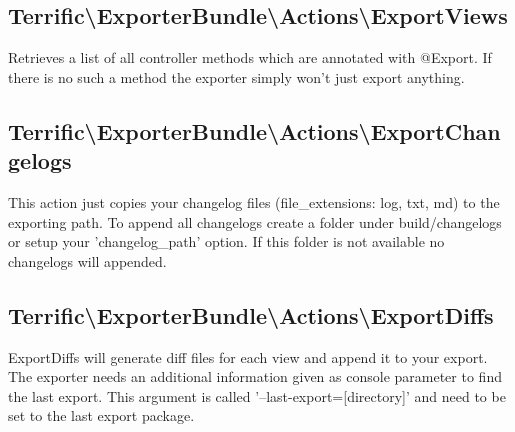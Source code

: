 \noindent \begin{minipage}{\textwidth}
\vspace{1.5em}
\hypertarget{sec-Actions-ExportViews}{\subsection{Terrific\textnormal{\textbackslash}ExporterBundle\textnormal{\textbackslash}Actions\textnormal{\textbackslash}ExportViews}}
Retrieves a list of all controller methods which are annotated with @Export. If there is no such a method the exporter simply won't just export anything.
\end{minipage}

\noindent \begin{minipage}{\textwidth}
\vspace{1.5em}
\hypertarget{sec-Actions-ExportChangelogs}{\subsection{Terrific\textnormal{\textbackslash}ExporterBundle\textnormal{\textbackslash}Actions\textnormal{\textbackslash}ExportChangelogs}}
This action just copies your changelog files (file\_extensions: log, txt, md) to the exporting path. To append all changelogs create a folder under build/changelogs or setup your \mbox{'changelog\_path'} option. If this folder is not available no changelogs will appended.
\end{minipage}

\noindent \begin{minipage}{\textwidth}
\vspace{1.5em}
\hypertarget{sec-Actions-ExportDiffs}{\subsection{Terrific\textnormal{\textbackslash}ExporterBundle\textnormal{\textbackslash}Actions\textnormal{\textbackslash}ExportDiffs}}
ExportDiffs will generate diff files for each view and append it to your export. The exporter needs an additional information given as console parameter to find the last export. This argument is called \mbox{'--last-export=[directory]'} and need to be set to the last export package.
\end{minipage}
